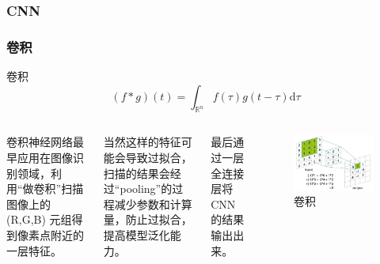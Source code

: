 \documentclass[mathserif,envcountsect,fontset=mac]{ctexbeamer}
\begin{document}
\subsubsection{CNN}
\begin{frame}
    \frametitle{卷积}
    \begin{definition}{卷积}
        \begin{equation}
            (f*g)(t)=\int_{\mathbb{R}^n}f(\tau)g(t-\tau)\mathrm{d}\tau
        \end{equation}
    \end{definition}
    \begin{columns}
        卷积神经网络最早应用在图像识别领域，利用“做卷积”扫描图像上的 (R,G,B) 元组得到像素点附近的一层特征。

        当然这样的特征可能会导致过拟合，扫描的结果会经过“pooling”的过程减少参数和计算量，防止过拟合，提高模型泛化能力。

        最后通过一层全连接层将CNN的结果输出出来。
        \begin{figure}
            \includegraphics[width=\linewidth]{../lib/CNN.jpeg}
            \caption{卷积}
            \label{CNN}
        \end{figure}
    \end{columns}

\end{frame}
\end{document}
